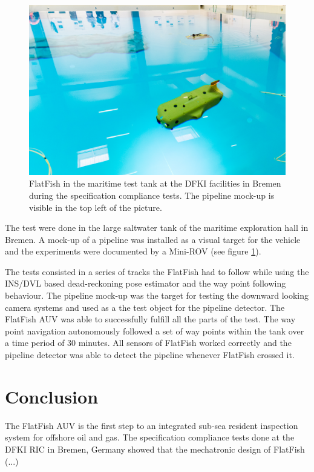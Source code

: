 \documentclass[conference]{IEEEtran}
\begin{document}
\begin{figure}[!t]
	\centering
	\includegraphics[width=0.9\columnwidth]{FlatFish-2.jpg}
	\caption{FlatFish in the maritime test tank at the DFKI facilities in Bremen during the specification compliance tests. The pipeline mock-up is visible in the top left of the picture.}
	\label{fig:flatfish2}
\end{figure}

The test were done in the large saltwater tank of the maritime exploration hall in Bremen. A mock-up of a pipeline was installed as a visual target for the vehicle and the experiments were documented by a Mini-ROV (see figure \ref{fig:flatfish2}). 

The tests consisted in a series of tracks the FlatFish had to follow while using the INS/DVL based dead-reckoning pose estimator and the way point following behaviour. The pipeline mock-up was the target for testing the downward looking camera systems and used as a the test object for the pipeline detector. The FlatFish AUV was able to successfully fulfill all the parts of the test. The way point navigation autonomously followed a set of way points within the tank over a time period of 30 minutes. All sensors of FlatFish worked correctly and the pipeline detector was able to detect the pipeline whenever FlatFish crossed it. 

\section{Conclusion}

The FlatFish AUV is the first step to an integrated sub-sea resident inspection system for offshore oil and gas. The specification compliance tests done at the DFKI RIC in Bremen, Germany showed that the mechatronic design of FlatFish (...)
\end{document}
